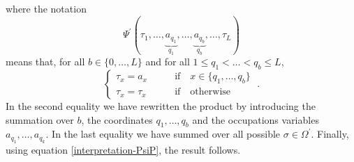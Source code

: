 \documentclass[10pt]{article}
\numberwithin{equation}{section}
\numberwithin{equation}{subsection}
\newcommand{\dt}{\;.}
\begin{document}
		where the notation
		\begin{equation}\label{notation-PSI}
			\Psi^{'}(\tau_{1},\ldots,\underbrace{a_{q_{1}}}_{q_{1}},\ldots,\underbrace{a_{q_{b}}}_{q_{b}},\ldots,\tau_{L})
		\end{equation}
		means that, for all $b\in \{0,\ldots,L\}$ and for all $1\leq q_{1}<\ldots<q_{b}\leq L$,
		\begin{equation}
			\begin{cases}
				\tau_{x}=a_{x}\qquad &\text{if}\quad x\in\{q_{1},\ldots,q_{b}\}\\
				\tau_{x}=\tau_{x}\qquad &\text{if}\quad \text{otherwise}
			\end{cases}\dt
		\end{equation}
		In the second equality we have rewritten the product by introducing the summation over $b$, the coordinates $q_{1},\ldots,q_{b}$ and the occupations variables $a_{q_{1}},\ldots,a_{q_{k}}$. In the last equality we have summed over all possible $\sigma\in \Omega^{'}$. Finally, using equation \eqref{interpretation-PsiP}, the result follows. 
\end{document}
